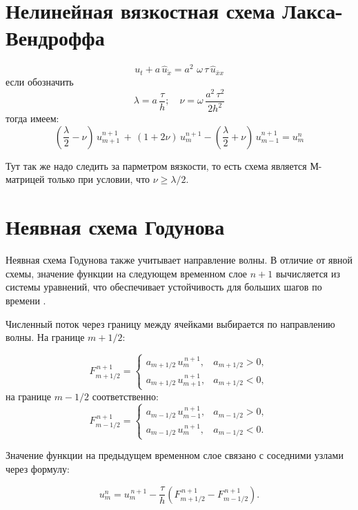 \documentclass[a4paper,14pt]{extreport}
\begin{document}
\section*{Нелинейная вязкостная схема Лакса-Вендроффа}
\begin{equation*}
	u_t + a\,\hat{u}_{\mathring{x}}=
	a^2\,\,\omega\,\tau\,\hat{u}_{\bar{x}x}
\end{equation*}
если обозначить
\begin{equation*}
	\lambda = a\,\frac{\tau}{h}; \quad \nu=\omega\,\frac{a^2\,\tau^2}{2h^2}
\end{equation*}
тогда имеем:
\begin{equation}
	\left(\frac{\lambda}{2}-\nu\right)\,u_{m+1}^{n+1}\,
	+\,(1+2\nu)\,u_{m}^{n+1}-\left(\frac{\lambda}{2} + \nu\right)\,u_{m-1}^{n+1} = u_m^n
\end{equation}

Тут так же надо следить за парметром вязкости, то есть схема является М-матрицей только при условии, что $\nu \geq \lambda / 2$.


\section*{Неявная схема Годунова}

Неявная схема Годунова также учитывает направление волны. В отличие от явной схемы, значение функции на следующем временном слое \(n+1\) вычисляется из системы уравнений, что обеспечивает устойчивость для больших шагов по времени \cite{imranov, kobelkov}.

Численный поток через границу между ячейками выбирается по направлению волны. На границе \(m+1/2\):

\[
F_{m+1/2}^{\,n+1} =
\begin{cases}
	a_{m+1/2}\, u_m^{\,n+1}, & a_{m+1/2} > 0,\\[1mm]
	a_{m+1/2}\, u_{m+1}^{\,n+1}, & a_{m+1/2} < 0,
\end{cases}
\]
на границе \(m-1/2\) соответственно:
\[
F_{m-1/2}^{\,n+1} =
\begin{cases}
	a_{m-1/2}\, u_{m-1}^{\,n+1}, & a_{m-1/2} > 0,\\[1mm]
	a_{m-1/2}\, u_{m}^{\,n+1}, & a_{m-1/2} < 0.
\end{cases}
\]

Значение функции на предыдущем временном слое связано с соседними узлами через формулу:

\begin{equation}
	u_m^n = u_m^{\,n+1} - \frac{\tau}{h} \left(F_{m+1/2}^{\,n+1} - F_{m-1/2}^{\,n+1}\right).
\end{equation}
\end{document}
